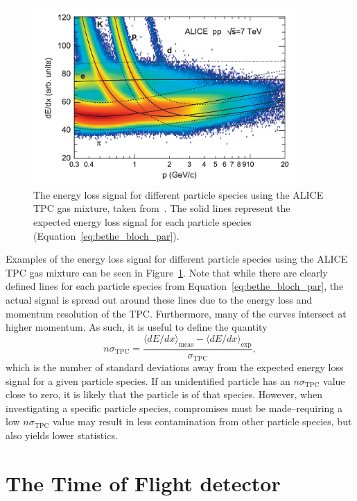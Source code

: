 \begin{figure}
    \centering
    \includegraphics[width=0.9\textwidth]{figures/experiment/tpc_pid_curves.png}
    \caption{The energy loss signal for different particle species using the ALICE TPC gas mixture, taken from~\cite{BetheBlochALEPH}. The solid lines represent the expected energy loss signal for each particle species (Equation~\ref{eq:bethe_bloch_par}).}
    \label{fig:tpc_pid_curves}
\end{figure}

Examples of the energy loss signal for different particle species using the ALICE TPC gas mixture can be seen in Figure~\ref{fig:tpc_pid_curves}. Note that while there are clearly defined lines for each particle species from Equation~\ref{eq:bethe_bloch_par}, the actual signal is spread out around these lines due to the energy loss and momentum resolution of the TPC. Furthermore, many of the curves intersect at higher momentum. As such, it is useful to define the quantity 
\begin{equation}
n\sigma_{\text{TPC}} = \frac{\langle dE/dx \rangle_{\text{meas}} - \langle dE/dx \rangle_{\text{exp}}}{\sigma_{\text{TPC}}},
\end{equation}
which is the number of standard deviations away from the expected energy loss signal for a given particle species. If an unidentified particle has an $n\sigma_{\text{TPC}}$ value close to zero, it is likely that the particle is of that species. However, when investigating a specific particle species, compromises must be made--requiring a low $n\sigma_{\text{TPC}}$ value may result in less contamination from other particle species, but also yields lower statistics.

\section{The Time of Flight detector}
\label{sec:tof}

